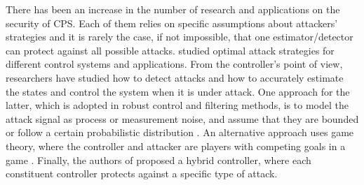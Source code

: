 \documentclass[../../thesis.tex]{subfiles}
\begin{document}
There has been an increase in the number of research and applications on the security of CPS. Each of them relies on specific assumptions about attackers' strategies and it is rarely the case, if not impossible, that one estimator/detector can protect against all possible attacks. 
\cite{Tong}\cite{KwonACC}\cite{liu2011false}\cite{teixeira2010cyber} studied optimal attack strategies for different control systems and applications. From the controller's point of view, researchers have studied how to detect attacks \cite{Blanke}\cite{Willsky} and how to accurately estimate the states and control the system when it is under attack. One approach for the latter, which is adopted in robust control and filtering methods, is to model the attack signal as process or measurement noise, and assume that they are bounded \cite{Zhou_Doyle} or follow a certain probabilistic distribution \cite{Bullo}\cite{Liu}.
An alternative approach uses game theory, where the controller and attacker are players with competing goals in a game \cite{Wu}\cite{Basar}\cite{Basar2}\cite{Walrand}\cite{Pappas}. Finally, the authors of \cite{KwonCDC} proposed a hybrid controller, where each constituent controller protects against a specific type of attack.
\end{document}
